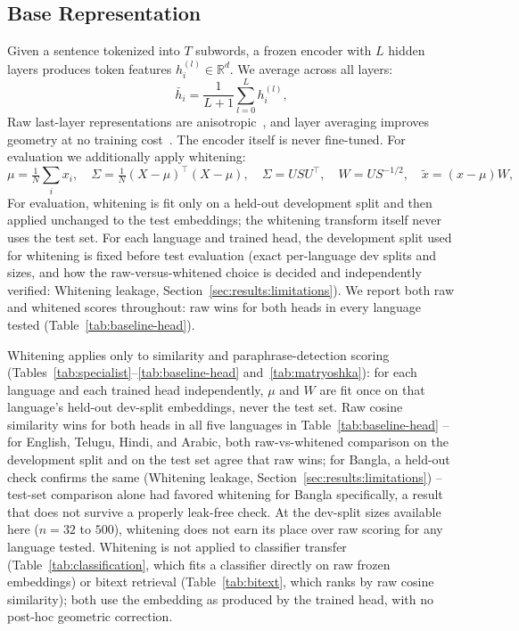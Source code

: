 \documentclass[manuscript]{acmart}
\begin{document}
\subsection{Base Representation}

Given a sentence tokenized into $T$ subwords, a frozen encoder with $L$ hidden layers produces token features $h_i^{(l)} \in \mathbb{R}^d$. We average across all layers:
\begin{equation}
\bar{h}_i = \frac{1}{L+1} \sum_{l=0}^{L} h_i^{(l)},
\label{eq:layeravg}
\end{equation}
Raw last-layer representations are anisotropic~\citep{li2020bertflow}, and layer averaging improves geometry at no training cost~\citep{hosseini2023layercombination}. The encoder itself is never fine-tuned. For evaluation we additionally apply whitening:
\begin{equation}
\mu = \tfrac{1}{N}\sum_i x_i, \quad \Sigma = \tfrac{1}{N}(X-\mu)^\top(X-\mu), \quad \Sigma = USU^\top, \quad W = US^{-1/2}, \quad \tilde x = (x-\mu)W,
\label{eq:whiten}
\end{equation}
For evaluation, whitening is fit only on a held-out development split and then applied unchanged to the test embeddings; the whitening transform itself never uses the test set. For each language and trained head, the development split used for whitening is fixed before test evaluation (exact per-language dev splits and sizes, and how the raw-versus-whitened choice is decided and independently verified: Whitening leakage, Section~\ref{sec:results:limitations}). We report both raw and whitened scores throughout: raw wins for both heads in every language tested (Table~\ref{tab:baseline-head}).

Whitening applies only to similarity and paraphrase-detection scoring (Tables~\ref{tab:specialist}--\ref{tab:baseline-head} and~\ref{tab:matryoshka}): for each language and each trained head independently, $\mu$ and $W$ are fit once on that language's held-out dev-split embeddings, never the test set. Raw cosine similarity wins for both heads in all five languages in Table~\ref{tab:baseline-head} -- for English, Telugu, Hindi, and Arabic, both raw-vs-whitened comparison on the development split and on the test set agree that raw wins; for Bangla, a held-out check confirms the same (Whitening leakage, Section~\ref{sec:results:limitations}) -- test-set comparison alone had favored whitening for Bangla specifically, a result that does not survive a properly leak-free check. At the dev-split sizes available here ($n{=}32$ to $500$), whitening does not earn its place over raw scoring for any language tested. Whitening is not applied to classifier transfer (Table~\ref{tab:classification}, which fits a classifier directly on raw frozen embeddings) or bitext retrieval (Table~\ref{tab:bitext}, which ranks by raw cosine similarity); both use the embedding as produced by the trained head, with no post-hoc geometric correction.
\end{document}
